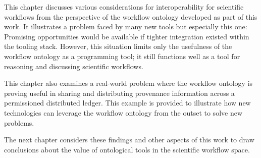 This chapter discusses various considerations for interoperability for
scientific workflows from the perspective of the workflow ontology developed as
part of this work. It illustrates a problem faced by many new tools but
especially this one: Promising opportunities would be available if tighter
integration existed within the tooling stack. However, this situation limits
only the usefulness of the workflow ontology as a programming tool; it still
functions well as a tool for reasoning and discussing scientific workflows. 

This chapter also examines a real-world problem where the workflow ontology is
proving useful in sharing and distributing provenance information across a
permissioned distributed ledger. This example is provided to illustrate how new
technologies can leverage the workflow ontology from the outset to solve new
problems. 

The next chapter considers these findings and other aspects of this work to
draw conclusions about the value of ontological tools in the scientific workflow
space.